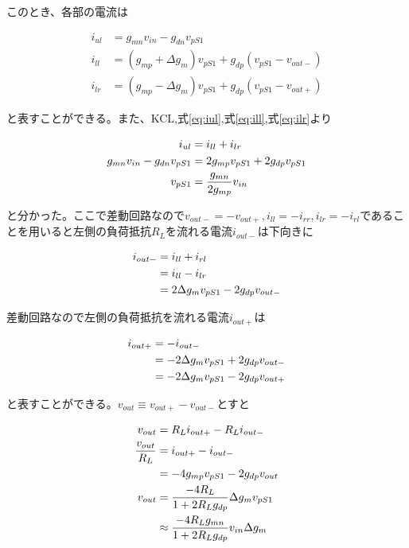 \documentclass[twocolumn]{jsarticle}
\begin{document}
このとき、各部の電流は

\begin{align}
    i_{ul}&=g_{mn}v_{in}-g_{dn}v_{pS1} \label{eq:iul}\\
    i_{ll}&=(g_{mp}+\Delta g_{m})v_{pS1}+g_{dp}(v_{pS1}-v_{out-}) \label{eq:ill}\\
    i_{lr}&=(g_{mp}-\Delta g_{m})v_{pS1}+g_{dp}(v_{pS1}-v_{out+}) \label{eq:ilr}
\end{align}

と表すことができる。また、KCL,式\eqref{eq:iul},式\eqref{eq:ill},式\eqref{eq:ilr}より

\begin{align}
    i_{ul}&=i_{ll}+i_{lr} \notag\\
    g_{mn}v_{in}-g_{dn}v_{pS1}&=2g_{mp}v_{pS1}+2g_{dp}v_{pS1} \notag\\
    v_{pS1}&=\frac{g_{mn}}{2g_{mp}}v_{in} \label{eq:vps}
\end{align}

と分かった。ここで差動回路なので$v_{out-}=-v_{out+},i_{ll}=-i_{rr},i_{lr}=-i_{rl}$であることを用いると左側の負荷抵抗$R_{L}$を流れる電流$i_{out-}$は下向きに

\begin{align}
    i_{out-}&=i_{ll}+i_{rl} \notag\\
    &=i_{ll}-i_{lr} \notag\\
    &=2\Delta g_{m}v_{pS1}-2g_{dp}v_{out-}
\end{align}

差動回路なので左側の負荷抵抗を流れる電流$i_{out+}$は

\begin{align}
    i_{out+}&=-i_{out-} \notag\\
    &=-2\Delta g_{m}v_{pS1}+2g_{dp}v_{out-} \notag\\
    &=-2\Delta g_{m}v_{pS1}-2g_{dp}v_{out+}
\end{align}

と表すことができる。$v_{out}\equiv v_{out+}-v_{out-}$とすと

\begin{align}
    v_{out}&=R_{L}i_{out+}-R_{L}i_{out-} \notag\\
    \frac{v_{out}}{R_L}&=i_{out+}-i_{out-} \notag\\
    &=-4g_{mp}v_{pS1}-2g_{dp}v_{out} \notag\\
    v_{out}&=\frac{-4R_{L}}{1+2R_{L}g_{dp}}\Delta g_{m}v_{pS1} \notag\\
    &\approx \frac{-4R_{L}g_{mn}}{1+2R_{L}g_{dp}}v_{in}\Delta g_{m}
\end{align}
\end{document}
